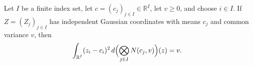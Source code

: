\begin{lemma}
\leanok
{}
Let $I$ be a finite index set, let $c=(c_j)_{j\in I}\in\mathbb R^I$, let $v\ge0$, and
choose $i\in I$. If $Z=(Z_j)_{j\in I}$ has independent Gaussian coordinates with means
$c_j$ and common variance $v$, then
\[
\int_{\mathbb R^I}(z_i-c_i)^2\,d\Bigl(\bigotimes_{j\in I}N(c_j,v)\Bigr)(z)=v.
\]
\end{lemma}
